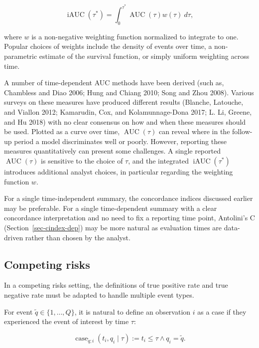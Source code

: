 \documentclass[
  letterpaper,
  krantz2]{style/krantz}
\begin{document}
\[
\operatorname{iAUC}(\tau^*) = \int^{\tau^*}_0 \operatorname{AUC}(\tau) w(\tau) \ d\tau,
\]

where \(w\) is a non-negative weighting function normalized to integrate
to one. Popular choices of weights include the density of events over
time, a non-parametric estimate of the survival function, or simply
uniform weighting across time.

A number of time-dependent AUC methods have been derived (such as,
Chambless and Diao 2006; Hung and Chiang 2010; Song and Zhou
2008).
Various surveys on these measures have produced different results
(Blanche, Latouche, and Viallon 2012; Kamarudin, Cox, and
Kolamunnage-Dona 2017; L. Li, Greene, and Hu 2018) with no clear
consensus on how and when these measures should be used. Plotted as a
curve over time, \(\operatorname{AUC}(\tau)\) can reveal where in the
follow-up period a model discriminates well or poorly. However,
reporting these measures quantitatively can present some challenges. A
single reported \(\operatorname{AUC}(\tau)\) is sensitive to the choice
of \(\tau\), and the integrated \(\operatorname{iAUC}(\tau^*)\)
introduces additional analyst choices, in particular regarding the
weighting function \(w\).

For a single time-independent summary, the concordance indices discussed
earlier may be preferable. For a single time-dependent summary with a
clear concordance interpretation and no need to fix a reporting time
point, Antolini's C (Section~\ref{sec-cindex-dep}) may be more natural
as evaluation times are data-driven rather than chosen by the analyst.

\subsection{Competing risks}\label{competing-risks-1}

In a competing risks
setting,
the definitions of true positive rate and true negative rate must be
adapted to handle multiple event types.

For event \(\tilde{q} \in \{1,\ldots,Q\}\), it is natural to define an
observation \(i\) as a case if they experienced the event of interest by
time \(\tau\):

\[
\operatorname{case}_{\tilde{q};i}(t_i, q_i  \mid  \tau) := t_i \le \tau \wedge q_i = \tilde{q}.
\]
\end{document}
